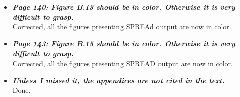 \documentclass[english]{article}
\begin{document}
\begin{itemize}
\item {
{\it
\textbf{
Page 140: Figure B.13 should be in color. 
Otherwise it is very difficult to grasp.
}%
}%
}%
\\
Corrected, all the figures presenting SPREAd output are now in color.


\item {
{\it
\textbf{
Page 143: Figure B.15 should be in color. 
Otherwise it is very difficult to grasp.
}%
}%
}%
\\
Corrected, all the figures presenting SPREAD output are now in color.




\item {
{\it
\textbf{
Unless I missed it, the appendices are not cited in the text.
}%
}%
}%
\\
Done.


\end{itemize}











%
\end{document}
